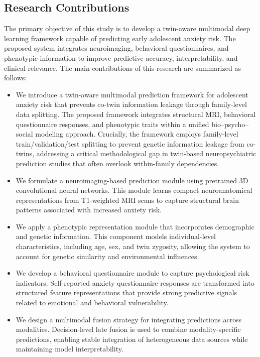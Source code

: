 \documentclass[10pt,letterpaper]{article}
\newcommand{\hlpar}[1]{\leavevmode\colorbox{yellow!30}{\parbox{\dimexpr\linewidth-2\fboxsep\relax}{#1}}\vspace{2pt}}
\begin{document}
        \subsection*{Research Contributions}

        \hlpar{The primary objective of this study is to develop a twin-aware multimodal deep learning framework capable of predicting early adolescent anxiety risk. The proposed system integrates neuroimaging, behavioral questionnaires, and phenotypic information to improve predictive accuracy, interpretability, and clinical relevance. The main contributions of this research are summarized as follows:}

        \begin{itemize}

        \item \hlpar{We introduce a twin-aware multimodal prediction framework for adolescent anxiety risk that prevents co-twin information leakage through family-level data splitting. The proposed framework integrates structural MRI, behavioral questionnaire responses, and phenotypic traits within a unified bio--psycho--social modeling approach. Crucially, the framework employs family-level train/validation/test splitting to prevent genetic information leakage from co-twins, addressing a critical methodological gap in twin-based neuropsychiatric prediction studies that often overlook within-family dependencies.}

        \item \hlpar{We formulate a neuroimaging-based prediction module using pretrained 3D convolutional neural networks. This module learns compact neuroanatomical representations from T1-weighted MRI scans to capture structural brain patterns associated with increased anxiety risk.}

        \item \hlpar{We apply a phenotypic representation module that incorporates demographic and genetic information. This component models individual-level characteristics, including age, sex, and twin zygosity, allowing the system to account for genetic similarity and environmental influences.}

        \item \hlpar{We develop a behavioral questionnaire module to capture psychological risk indicators. Self-reported anxiety questionnaire responses are transformed into structured feature representations that provide strong predictive signals related to emotional and behavioral vulnerability.}

        \item \hlpar{We design a multimodal fusion strategy for integrating predictions across modalities. Decision-level late fusion is used to combine modality-specific predictions, enabling stable integration of heterogeneous data sources while maintaining model interpretability.}

        \end{itemize}
\end{document}
